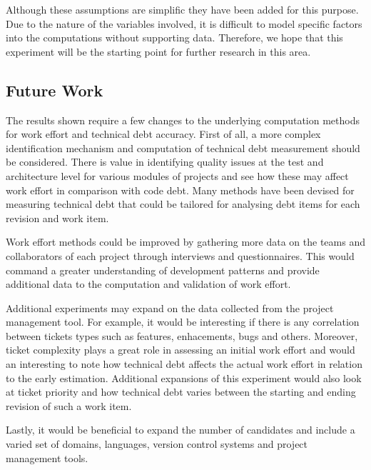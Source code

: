 \documentclass{mpaper}
\begin{document}
Although these assumptions are simplific they have been added for this purpose.
Due to the nature of the variables involved, it is difficult to model specific
factors into the computations without supporting data. Therefore, we hope that
this experiment will be the starting point for further research in this area. 

\subsection{Future Work}
\label{future-work}

The results shown require a few changes to the underlying computation methods
for work effort and technical debt accuracy. First of all, a more complex
identification mechanism and computation of technical debt measurement should be
considered. There is value in identifying quality issues at the test and
architecture level for various modules of projects and see how these may affect
work effort in comparison with code debt. Many methods \cite{Fontana2016}
\cite{Letouzey2012} have been devised for measuring technical debt that could be
tailored for analysing debt items for each revision and work item.

Work effort methods could be improved by gathering more data on the teams and
collaborators of each project through interviews and questionnaires. This would
command a greater understanding of development patterns and provide additional
data to the computation and validation of work effort.

Additional experiments may expand on the data collected from the project
management tool. For example, it would be interesting if there is any
correlation between tickets types such as features, enhacements, bugs and
others. Moreover, ticket complexity plays a great role in assessing an initial
work effort and would an interesting to note how technical debt affects the
actual work effort in relation to the early estimation. Additional expansions of
this experiment would also look at ticket priority and how technical debt varies
between the starting and ending revision of such a work item. 

Lastly, it would be beneficial to expand the number of candidates and include a
varied set of domains, languages, version control systems and project management
tools.

\end{document}
